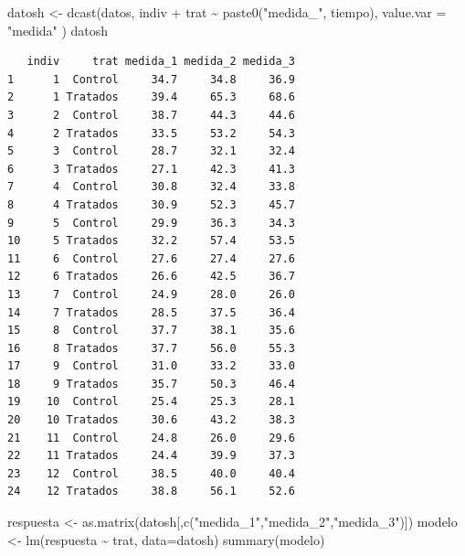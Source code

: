 \documentclass[
]{book}
\newenvironment{Shaded}{\begin{snugshade}}{\end{snugshade}}
\newcommand{\AttributeTok}[1]{\textcolor[rgb]{0.77,0.63,0.00}{#1}}
\newcommand{\FunctionTok}[1]{\textcolor[rgb]{0.00,0.00,0.00}{#1}}
\newcommand{\NormalTok}[1]{#1}
\newcommand{\OtherTok}[1]{\textcolor[rgb]{0.56,0.35,0.01}{#1}}
\newcommand{\SpecialCharTok}[1]{\textcolor[rgb]{0.00,0.00,0.00}{#1}}
\newcommand{\StringTok}[1]{\textcolor[rgb]{0.31,0.60,0.02}{#1}}
\begin{document}
\begin{Shaded}
\begin{Highlighting}[]
\NormalTok{datosh }\OtherTok{\textless{}{-}} \FunctionTok{dcast}\NormalTok{(datos, indiv }\SpecialCharTok{+}\NormalTok{ trat }\SpecialCharTok{\textasciitilde{}} \FunctionTok{paste0}\NormalTok{(}\StringTok{"medida\_"}\NormalTok{, tiempo),}
                 \AttributeTok{value.var =} \StringTok{"medida"}\NormalTok{ )}
\NormalTok{datosh}
\end{Highlighting}
\end{Shaded}

\begin{verbatim}
   indiv     trat medida_1 medida_2 medida_3
1      1  Control     34.7     34.8     36.9
2      1 Tratados     39.4     65.3     68.6
3      2  Control     38.7     44.3     44.6
4      2 Tratados     33.5     53.2     54.3
5      3  Control     28.7     32.1     32.4
6      3 Tratados     27.1     42.3     41.3
7      4  Control     30.8     32.4     33.8
8      4 Tratados     30.9     52.3     45.7
9      5  Control     29.9     36.3     34.3
10     5 Tratados     32.2     57.4     53.5
11     6  Control     27.6     27.4     27.6
12     6 Tratados     26.6     42.5     36.7
13     7  Control     24.9     28.0     26.0
14     7 Tratados     28.5     37.5     36.4
15     8  Control     37.7     38.1     35.6
16     8 Tratados     37.7     56.0     55.3
17     9  Control     31.0     33.2     33.0
18     9 Tratados     35.7     50.3     46.4
19    10  Control     25.4     25.3     28.1
20    10 Tratados     30.6     43.2     38.3
21    11  Control     24.8     26.0     29.6
22    11 Tratados     24.4     39.9     37.3
23    12  Control     38.5     40.0     40.4
24    12 Tratados     38.8     56.1     52.6
\end{verbatim}

\begin{Shaded}
\begin{Highlighting}[]
\NormalTok{respuesta }\OtherTok{\textless{}{-}} \FunctionTok{as.matrix}\NormalTok{(datosh[,}\FunctionTok{c}\NormalTok{(}\StringTok{"medida\_1"}\NormalTok{,}\StringTok{"medida\_2"}\NormalTok{,}\StringTok{"medida\_3"}\NormalTok{)])}
\NormalTok{modelo }\OtherTok{\textless{}{-}} \FunctionTok{lm}\NormalTok{(respuesta }\SpecialCharTok{\textasciitilde{}}\NormalTok{ trat, }\AttributeTok{data=}\NormalTok{datosh)}
\FunctionTok{summary}\NormalTok{(modelo)}
\end{Highlighting}
\end{Shaded}
\end{document}
